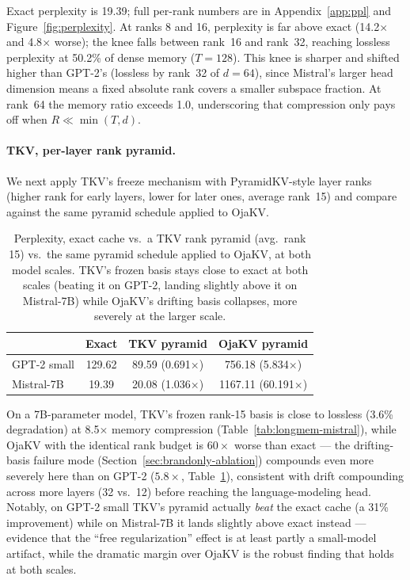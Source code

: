 \documentclass{article}
\begin{document}
Exact perplexity is 19.39; full per-rank numbers are in
Appendix~\ref{app:ppl} and Figure~\ref{fig:perplexity}.
At ranks 8 and 16, perplexity is far above exact (14.2$\times$ and
4.8$\times$ worse); the knee falls between rank~16 and rank~32, reaching
lossless perplexity at 50.2\% of dense memory ($T=128$).  This knee is
sharper and shifted higher than GPT-2's (lossless by rank~32 of $d=64$),
since Mistral's larger head dimension means a fixed absolute rank covers a
smaller subspace fraction.  At rank~64 the memory ratio exceeds 1.0,
underscoring that compression only pays off when $R \ll \min(T, d)$.

\paragraph{TKV, per-layer rank pyramid.}  We next apply TKV's freeze
mechanism with PyramidKV-style \citep{pyramidkv2024} layer ranks (higher rank for early layers,
lower for later ones, average rank~15) and compare against the same pyramid
schedule applied to OjaKV.

\begin{table}[t]
\centering
\caption{Perplexity, exact cache vs.\ a TKV rank pyramid (avg.\ rank 15)
vs.\ the same pyramid schedule applied to OjaKV, at both model scales.
TKV's frozen basis stays close to exact at both scales (beating it on
GPT-2, landing slightly above it on Mistral-7B) while OjaKV's drifting
basis collapses, more severely at the larger scale.}
\label{tab:ppl-pyramid}
\small
\begin{tabular}{lccc}
\toprule
& Exact & TKV pyramid & OjaKV pyramid \\
\midrule
GPT-2 small & 129.62 & 89.59 (0.691$\times$) & 756.18 (5.834$\times$) \\
Mistral-7B & 19.39 & 20.08 (1.036$\times$) & 1167.11 (60.191$\times$) \\
\bottomrule
\end{tabular}
\normalsize
\end{table}

On a 7B-parameter model, TKV's frozen rank-15 basis is close to lossless
(3.6\% degradation) at 8.5$\times$ memory compression
(Table~\ref{tab:longmem-mistral}), while OjaKV with the identical rank
budget is $60\times$ worse than exact --- the drifting-basis failure mode
(Section~\ref{sec:brandonly-ablation}) compounds even more severely here
than on GPT-2 ($5.8\times$, Table~\ref{tab:ppl-pyramid}), consistent with
drift compounding across more layers (32 vs.\ 12) before reaching the
language-modeling head.  Notably, on GPT-2 small TKV's pyramid actually
\emph{beat} the exact cache (a 31\% improvement) while on Mistral-7B it
lands slightly above exact instead --- evidence that the ``free
regularization'' effect is at least partly a small-model artifact, while
the dramatic margin over OjaKV is the robust finding that holds at both
scales.
\end{document}

